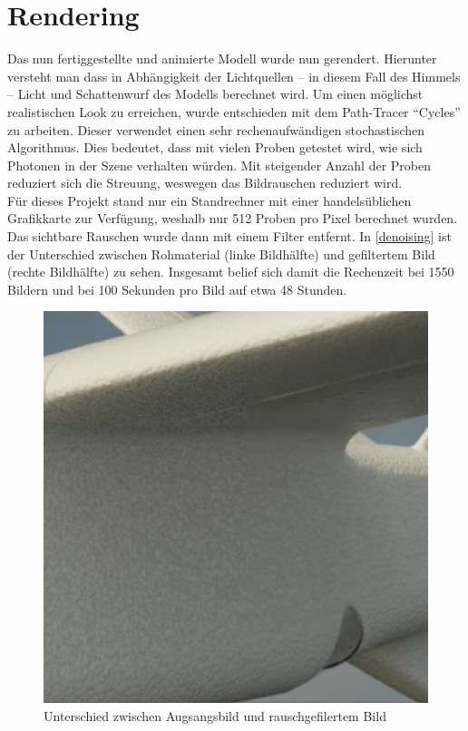 \section{Rendering}

Das nun fertiggestellte und animierte Modell wurde nun gerendert. Hierunter versteht man dass in Abhängigkeit der Lichtquellen -- in diesem Fall des Himmels -- Licht und Schattenwurf des Modells berechnet wird. Um einen möglichst realistischen Look zu erreichen, wurde entschieden mit dem Path-Tracer ``Cycles'' zu arbeiten. Dieser verwendet einen sehr rechenaufwändigen stochastischen Algorithmus. Dies bedeutet, dass mit vielen Proben getestet wird, wie sich Photonen in der Szene verhalten würden. Mit steigender Anzahl der Proben reduziert sich die Streuung, weswegen das Bildrauschen reduziert wird. \cite{cycles}\\
Für dieses Projekt stand nur ein Standrechner mit einer handelsüblichen Grafikkarte zur Verfügung, weshalb nur 512 Proben pro Pixel berechnet wurden. Das sichtbare Rauschen wurde dann mit einem Filter entfernt. In \autoref{denoising} ist der Unterschied zwischen Rohmaterial (linke Bildhälfte) und gefiltertem Bild (rechte Bildhälfte) zu sehen. Insgesamt belief sich damit die Rechenzeit bei 1550 Bildern und bei 100 Sekunden pro Bild auf etwa 48 Stunden.

\begin{figure}[H]
\begin{center}
\includegraphics[width=\textwidth]{gfx/post/denoising.jpg}
\caption{Unterschied zwischen Augsangsbild und rauschgefilertem Bild}
\label{denoising}
\end{center}
\end{figure}


